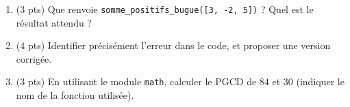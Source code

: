 \begin{enumerate}
  \item (3 pts) Que renvoie \lstinline{somme_positifs_bugue([3, -2, 5])} ? Quel est le résultat attendu ?
  \item (4 pts) Identifier précisément l'erreur dans le code, et proposer une version corrigée.
  \item (3 pts) En utilisant le module \lstinline{math}, calculer le PGCD de $84$ et $30$ (indiquer le nom de la fonction utilisée).
\end{enumerate}

